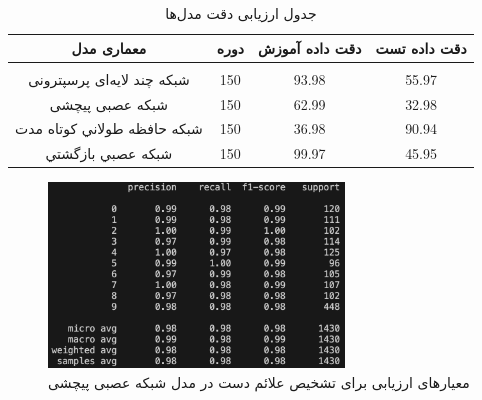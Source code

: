 \begin{table}[h!]
    \centering
    \begin{tabular}{||c c c c||}
     \hline
     \rule{0pt}{3ex} معماری مدل & دوره & دقت داده آموزش & دقت داده تست  \\ [1.5ex]
     \hline
     \hline
     \rule{0pt}{0.5ex} & & & \\  
     شبکه چند لایه‌ای پرسپترونی & 150 & 93.98 \text{\%} & 55.97 \text{\%} \\ [2.5ex]
     شبکه عصبی پیچشی & 150 & 62.99 \text{\%} & 32.98 \text{\%} \\ [2.5ex]
     شبکه حافظه طولاني كوتاه مدت & 150 & 36.98 \text{\%} & 90.94 \text{\%} \\ [2.5ex]
     شبکه عصبي بازگشتي & 150 & 99.97 \text{\%} & 45.95 \text{\%} \\ [2.5ex]
     \hline
    \end{tabular}
    \caption{جدول ارزیابی دقت مدل‌ها}
    \label{table:2}
\end{table}



\begin{figure}[h]
    \centering
    \includegraphics[width=0.7\textwidth]{Report_CNN.png}
    \caption{ معیارهای ارزیابی برای تشخیص علائم دست در مدل شبکه عصبی پیچشی}
    \label{report}
\end{figure}



